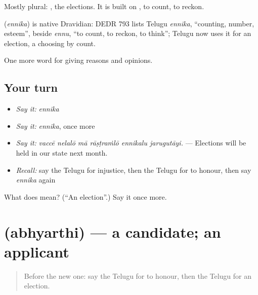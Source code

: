 Mostly plural: , the elections. It is built on , to count, to reckon.

\begin{cousinweb}
\textbf{} (\emph{ennika}) is native Dravidian: DEDR 793 lists Telugu \emph{ennika}, \textquotedblleft{}counting, number, esteem\textquotedblright{}, beside \emph{ennu}, \textquotedblleft{}to count, to reckon, to think\textquotedblright{}; Telugu now uses it for an election, a choosing by count.
\end{cousinweb}

\begin{grammarlens}[title={What you've built}]
One more word for giving reasons and opinions.
\end{grammarlens}

\subsection*{Your turn}
\begin{itemize}
\raggedright
  \item \emph{Say it:} \emph{ennika}
  \item \emph{Say it:} \emph{ennika}, once more
  \item \emph{Say it:} \emph{vaccē nelalō mā rāṣṭraṁlō ennikalu jarugutāyi.} — Elections will be held in our state next month.
  \item \emph{Recall:} say the Telugu for injustice, then the Telugu for to honour, then say \emph{ennika} again
\end{itemize}

\begin{tcolorbox}[breakable,colback=teal!4,colframe=teal!35!black,title={Before you move on}]
What does  mean? (\textquotedblleft{}An election\textquotedblright{}.) Say it once more.
\end{tcolorbox}
\section[\texorpdfstring{\te{అభ్యర్థి} (abhyarthi)}{అభ్యర్థి (abhyarthi)}]{ (abhyarthi) — a candidate; an applicant}

\label{lesson:TE-C400-abhyarthi}



\begin{quote}
Before the new one: say the Telugu for to honour, then the Telugu for an election.
\end{quote}

